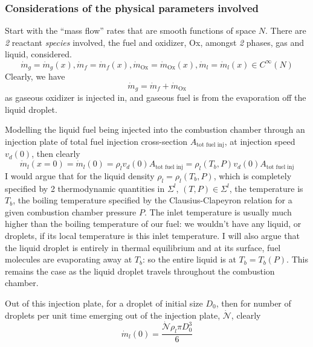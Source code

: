 \documentclass[10pt]{amsart}
\begin{document}
\begin{multicols*}{2}
\begin{itemize}
\end{itemize}

\subsubsection{Considerations of the physical parameters involved}

Start with the ``mass flow'' rates that are smooth functions of space $N$.  There are \emph{2} reactant \emph{species} involved, the fuel and oxidizer, Ox, amongst \emph{2} phases, gas and liquid, considered.  
\[
\dot{m}_g = \dot{m}_g(x), \dot{m}_f = \dot{m}_f(x), \dot{m}_{\text{Ox}} = \dot{m}_{\text{Ox}}(x), \dot{m}_l = \dot{m}_l(x) \in C^{\infty}(N)
\]
Clearly, we have
\begin{equation}
\dot{m}_g = \dot{m}_f + \dot{m}_{\text{Ox}}
\end{equation}
as gaseous oxidizer is injected in, and gaseous fuel is from the evaporation off the liquid droplet.  

Modelling the liquid fuel being injected into the combustion chamber through an injection plate of total fuel injection cross-section $A_{\text{tot fuel inj}}$, at injection speed $v_d(0)$, then clearly
\begin{equation}\label{Eq:dotm_l0_def}
\dot{m}_l(x=0) = \dot{m}_l(0) = \rho_l v_d(0) A_{\text{tot fuel inj}} = \rho_l(T_b,P) v_d(0) A_{\text{tot fuel inj}}
\end{equation}
I would argue that for the liquid density $\rho_l = \rho_l(T_b,P)$, which is completely specified by 2 thermodynamic quantities in $\Sigma^l$, $(T,P) \in \Sigma^l$, the temperature is $T_b$, the boiling temperature specified by the Clausius-Clapeyron relation for a given combustion chamber pressure $P$.  The inlet temperature is usually much higher than the boiling temperature of our fuel: we wouldn't have any liquid, or droplets, if its local temperature is this inlet temperature.  I will also argue that the liquid droplet is entirely in thermal equilibrium and at its surface, fuel molecules are evaporating away at $T_b$: so the entire liquid is at $T_b = T_b(P)$.  This remains the case as the liquid droplet travels throughout the combustion chamber.

Out of this injection plate, for a droplet of initial size $D_0$, then for number of droplets per unit time emerging out of the injection plate, $\dot{\mathcal{N}}$, clearly
\[
\dot{m}_l(0) = \frac{ \dot{\mathcal{N}} \rho_l \pi D_0^3}{ 6 }
\]


\end{multicols*}
\end{document}
